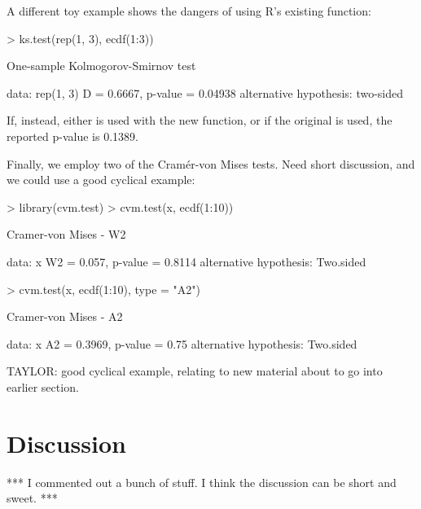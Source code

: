 A different toy example shows the dangers of using R's existing
 function:
\begin{Schunk}
\begin{Sinput}
> ks.test(rep(1, 3), ecdf(1:3))
\end{Sinput}
\begin{Soutput}
	One-sample Kolmogorov-Smirnov test

data:  rep(1, 3) 
D = 0.6667, p-value = 0.04938
alternative hypothesis: two-sided 
\end{Soutput}
\end{Schunk}
If, instead, either  is used with the new
 function, or if the original 
is used, the reported p-value is 0.1389.

Finally, we employ two of the Cram\'{e}r-von Mises tests.  Need short discussion,
and we could use a good cyclical example:
\begin{Schunk}
\begin{Sinput}
> library(cvm.test)
> cvm.test(x, ecdf(1:10))
\end{Sinput}
\begin{Soutput}
	Cramer-von Mises - W2

data:  x 
W2 = 0.057, p-value = 0.8114
alternative hypothesis: Two.sided 
\end{Soutput}
\begin{Sinput}
> cvm.test(x, ecdf(1:10), type = "A2")
\end{Sinput}
\begin{Soutput}
	Cramer-von Mises - A2

data:  x 
A2 = 0.3969, p-value = 0.75
alternative hypothesis: Two.sided 
\end{Soutput}
\end{Schunk}

TAYLOR: good cyclical example, relating to new material about to go into
earlier section.


\section{Discussion}

*** I commented out a bunch of stuff.  I think the discussion can be short
and sweet. ***

